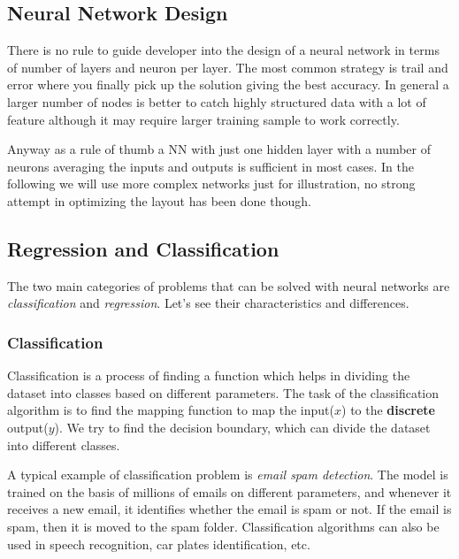 \subsection{Neural Network Design}\label{neural-network-design}

There is no rule to guide developer into the design of a neural network
in terms of number of layers and neuron per layer. The most common
strategy is trail and error where you finally pick up the solution
giving the best accuracy. In general a larger number of nodes is better
to catch highly structured data with a lot of feature although it may
require larger training sample to work correctly.

Anyway as a rule of thumb a NN with just one hidden layer with a number
of neurons averaging the inputs and outputs is sufficient in most cases.
In the following we will use more complex networks just for
illustration, no strong attempt in optimizing the layout has been done
though.

\subsection{Regression and		Classification}\label{regression-and-classification}

The two main categories of problems that can be solved with neural
networks are \emph{classification} and \emph{regression}. Let's see
their characteristics and differences.

\subsubsection{Classification}\label{classification}

Classification is a process of finding a function which helps in dividing
the dataset into classes based on different parameters. 
The task of the classification algorithm is to find the mapping function
to map the input(\(x\)) to the \textbf{discrete} output(\(y\)). We try
to find the decision boundary, which can divide the dataset into
different classes.

A typical example of classification problem is
\emph{email spam detection}. The model is trained on the basis of millions of
emails on different parameters, and whenever it receives a new email, it
identifies whether the email is spam or not. If the email is spam, then
it is moved to the spam folder. Classification algorithms can also be used in
speech recognition, car plates identification, etc.

